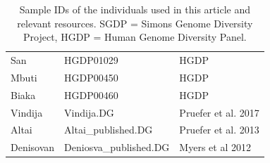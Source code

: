 \documentclass{article}
\begin{document}
\begin{table}[ht]
\begin{tabular}{lll}
  San & HGDP01029 & HGDP \\ 
  Mbuti & HGDP00450 & HGDP \\ 
  Biaka & HGDP00460 & HGDP \\ 
  Vindija & Vindija.DG & Pruefer et al. 2017 \\ 
  Altai & Altai\_published.DG & Pruefer et al. 2013 \\ 
  Denisovan & Deniosva\_published.DG & Myers et al 2012 \\ 
   \hline
\end{tabular}
\caption{Sample IDs of the individuals used in this article and relevant resources. SGDP = Simons Genome Diversity Project, HGDP = Human Genome Diversity Panel.} 
\label{samples}
\end{table}

\end{document}
